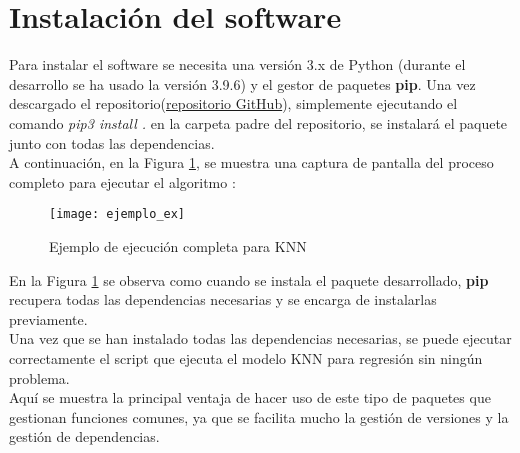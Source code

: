 \section{Instalación del software}
Para instalar el software se necesita una versión 3.x de Python (durante el desarrollo se ha usado la versión 3.9.6) y el gestor de paquetes \textbf{pip}. Una vez descargado el repositorio(\href{https://github.com/antoniomanuelfr/TFG.git}{repositorio GitHub}), simplemente ejecutando el comando \textit{pip3 install .} en la carpeta padre del repositorio, se instalará el paquete junto con todas las dependencias.\\
A continuación, en la Figura \ref{cap:ex}, se muestra una captura de pantalla del proceso completo para ejecutar el algoritmo :
\begin{figure}[H]
    \texttt{[image: ejemplo\_ex]}
    \caption{Ejemplo de ejecución completa para KNN}
    \label{cap:ex}
\end{figure}
En la Figura \ref{cap:ex} se observa como cuando se instala el paquete desarrollado, \textbf{pip} recupera todas las dependencias necesarias y se encarga de instalarlas previamente. \\
Una vez que se han instalado todas las dependencias necesarias, se puede ejecutar correctamente el script que ejecuta el modelo KNN para regresión sin ningún problema.\\
\linebreak
Aquí se muestra la principal ventaja de hacer uso de este tipo de paquetes que gestionan funciones comunes, ya que se facilita mucho la gestión de versiones y la gestión de dependencias.